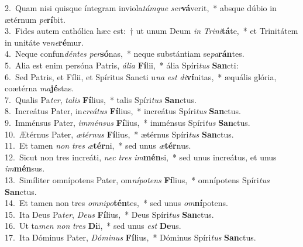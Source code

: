 {2.~}Quam nisi quisque íntegram inviola\textit{tám}\textit{que} \textit{ser}\textbf{vá}verit,~* absque dúbio in ætérnum \textit{pe}\textbf{rí}bit.\\
{3.~}Fides autem cathólica hæc est:~† ut unum Deum \textit{in} \textit{Tri}\textit{ni}\textbf{tá}te,~* et Trinitátem in unitáte ve\textit{ne}\textbf{ré}mur.\\
{4.~}Neque confun\textit{dén}\textit{tes} \textit{per}\textbf{só}nas,~* neque substántiam se\textit{pa}\textbf{rán}tes.\\
{5.~}Alia est enim persóna Patris, \textit{á}\textit{li}\textit{a} \textbf{Fí}lii,~* ália Spíri\textit{tus} \textbf{San}cti:\\
{6.~}Sed Patris, et Fílii, et Spíritus Sancti u\textit{na} \textit{est} \textit{di}\textbf{ví}nitas,~* æquális glória, coætérna \textit{ma}\textbf{jé}stas.\\
{7.~}Qualis Pa\textit{ter}, \textit{ta}\textit{lis} \textbf{Fí}lius,~* talis Spíri\textit{tus} \textbf{San}ctus.\\
{8.~}Increátus Pater, in\textit{cre}\textit{á}\textit{tus} \textbf{Fí}lius,~* increátus Spíri\textit{tus} \textbf{San}ctus.\\
{9.~}Imménsus Pater, \textit{im}\textit{mén}\textit{sus} \textbf{Fí}lius,~* imménsus Spíri\textit{tus} \textbf{San}ctus.\\
{10.~}Ætérnus Pater, \textit{æ}\textit{tér}\textit{nus} \textbf{Fí}lius,~* ætérnus Spíri\textit{tus} \textbf{San}ctus.\\
{11.~}Et tamen \textit{non} \textit{tres} \textit{æ}\textbf{tér}ni,~* sed unus \textit{æ}\textbf{tér}nus.\\
{12.~}Sicut non tres increáti, \textit{nec} \textit{tres} \textit{im}\textbf{mén}si,~* sed unus increátus, et unus \textit{im}\textbf{mén}sus.\\
{13.~}Simíliter omnípotens Pater, om\textit{ní}\textit{po}\textit{tens} \textbf{Fí}lius,~* omnípotens Spíri\textit{tus} \textbf{San}ctus.\\
{14.~}Et tamen non tres \textit{om}\textit{ni}\textit{po}\textbf{tén}tes,~* sed unus \textit{om}\textbf{ní}potens.\\
{15.~}Ita Deus Pa\textit{ter}, \textit{De}\textit{us} \textbf{Fí}lius,~* Deus Spíri\textit{tus} \textbf{San}ctus.\\
{16.~}Ut ta\textit{men} \textit{non} \textit{tres} \textbf{Di}i,~* sed unus \textit{est} \textbf{De}us.\\
{17.~}Ita Dóminus Pater, \textit{Dó}\textit{mi}\textit{nus} \textbf{Fí}lius,~* Dóminus Spíri\textit{tus} \textbf{San}ctus.\\
